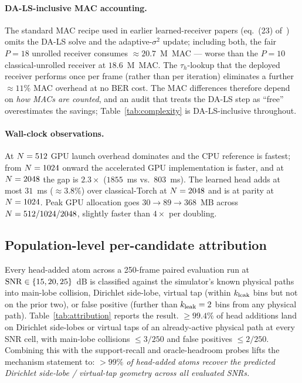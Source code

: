 \paragraph{DA-LS-inclusive MAC accounting.}
The standard MAC recipe used in earlier learned-receiver papers
(eq.~(23) of~\cite{he2020modeldrivenmimo}) omits the DA-LS solve and
the adaptive-$\sigma^2$ update; including both, the fair $P{=}18$
unrolled receiver consumes $\approx 20.7$~M~MAC --- worse than the
$P{=}10$ classical-unrolled receiver at $18.6$~M~MAC. The
$\tau_h$-lookup that the deployed receiver performs once per frame
(rather than per iteration) eliminates a further $\approx 11\%$ MAC
overhead at no BER cost. The MAC differences therefore depend on
\emph{how MACs are counted}, and an audit that treats the DA-LS step
as ``free'' overestimates the savings; Table~\ref{tab:complexity} is
DA-LS-inclusive throughout.

\paragraph{Wall-clock observations.}
At $N=512$ GPU launch overhead dominates and the CPU reference is fastest;
from $N=1024$ onward the accelerated GPU implementation is faster, and at
$N=2048$ the gap is $2.3\times$ ($1855$~ms vs.\ $803$~ms). The
learned head adds at most $31$~ms ($\approx 3.8\%$) over classical-Torch
at $N=2048$ and is at parity at $N=1024$. Peak GPU allocation
goes $30\!\to\!89\!\to\!368$~MB across $N=512/1024/2048$, slightly
faster than $4\times$ per doubling.

\subsection{Population-level per-candidate attribution}
\label{ssec:exp_attribution}
Every head-added atom across a 250-frame paired evaluation run at
$\mathrm{SNR}\in\{15,20,25\}$~dB is classified against the simulator's known
physical paths into main-lobe collision, Dirichlet side-lobe, virtual
tap (within $k_{\mathrm{leak}}$ bins but not on the prior two), or false positive
(further than $k_{\mathrm{leak}}=2$ bins from any physical path).
Table~\ref{tab:attribution} reports the result. $\geq 99.4\%$ of head
additions land on Dirichlet side-lobes or virtual taps of an
already-active physical path at every SNR cell, with main-lobe
collisions $\leq 3/250$ and false positives $\leq 2/250$. Combining
this with the support-recall and oracle-headroom probes lifts the
mechanism statement to: \emph{$>99\%$ of head-added atoms recover the
predicted Dirichlet side-lobe / virtual-tap geometry across all
evaluated SNRs.}

